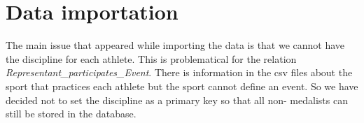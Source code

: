%
%
%
%

\chapter{Data importation}

The main issue that appeared while importing the data is that we cannot have the discipline for each athlete. This is problematical for the relation \textit{Representant\_participates\_Event}. There is information in the csv files about the sport that practices each athlete but the sport cannot define an event. So we have decided not to set the discipline as a primary key so that all non- medalists can still be stored in the database.

\begin{center}
	
\end{center}



